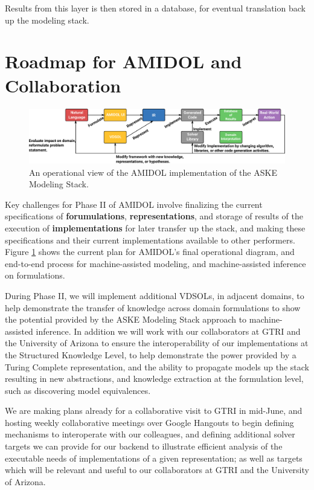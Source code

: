 \documentclass[11pt]{article}
\newcommand{\amidol}{\textsc{AMIDOL}}
\begin{document}
Results from this layer is then stored in a database, for eventual
translation back up the modeling stack.

\section{Roadmap for \amidol{} and Collaboration}

\begin{figure}
  \includegraphics[width=\textwidth]{figs/meta-model-diagram-AMIDOL.pdf}
  \caption{An operational view of the \amidol{} implementation of the
    ASKE Modeling Stack.}
  \label{Fig:AMIDOL-Ops}
\end{figure}

Key challenges for Phase II of \amidol{} involve finalizing the
current specifications of \textbf{forumulations},
\textbf{representations}, and storage of results of the execution of
\textbf{implementations} for later transfer up the stack, and making
these specifications and their current implementations available to
other performers.  Figure \ref{Fig:AMIDOL-Ops} shows the current plan
for \amidol{}'s final operational diagram, and end-to-end process for
machine-assisted modeling, and machine-assisted inference on
formulations.

During Phase II, we will implement additional VDSOLs, in adjacent
domains, to help demonstrate the transfer of knowledge across domain
formulations to show the potential provided by the ASKE Modeling Stack
approach to machine-assisted inference.  In addition we will work with
our collaborators at GTRI and the University of Arizona to ensure the
interoperability of our implementations at the Structured Knowledge
Level, to help demonstrate the power provided by a Turing Complete
representation, and the ability to propagate models up the stack
resulting in new abstractions, and knowledge extraction at the
formulation level, such as discovering model equivalences.

We are making plans already for a collaborative visit to GTRI in
mid-June, and hosting weekly collaborative meetings over Google
Hangouts to begin defining mechanisms to interoperate with our
colleagues, and defining additional solver targets we can provide for
our backend to illustrate efficient analysis of the executable needs
of implementations of a given representation; as well as targets which
will be relevant and useful to our collaborators at GTRI and the
University of Arizona.
\end{document}
